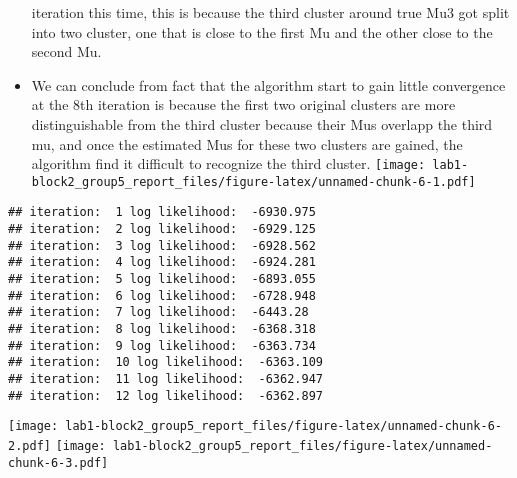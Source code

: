 \documentclass[]{article}
\begin{document}
\begin{itemize}
  iteration this time, this is because the third cluster around true Mu3
  got split into two cluster, one that is close to the first Mu and the
  other close to the second Mu.
\item
  We can conclude from fact that the algorithm start to gain little
  convergence at the 8th iteration is because the first two original
  clusters are more distinguishable from the third cluster because their
  Mus overlapp the third mu, and once the estimated Mus for these two
  clusters are gained, the algorithm find it difficult to recognize the
  third cluster.
  \texttt{[image: lab1-block2\_group5\_report\_files/figure-latex/unnamed-chunk-6-1.pdf]}
\end{itemize}

\begin{verbatim}
## iteration:  1 log likelihood:  -6930.975 
## iteration:  2 log likelihood:  -6929.125 
## iteration:  3 log likelihood:  -6928.562 
## iteration:  4 log likelihood:  -6924.281 
## iteration:  5 log likelihood:  -6893.055 
## iteration:  6 log likelihood:  -6728.948 
## iteration:  7 log likelihood:  -6443.28 
## iteration:  8 log likelihood:  -6368.318 
## iteration:  9 log likelihood:  -6363.734 
## iteration:  10 log likelihood:  -6363.109 
## iteration:  11 log likelihood:  -6362.947 
## iteration:  12 log likelihood:  -6362.897
\end{verbatim}

\texttt{[image: lab1-block2\_group5\_report\_files/figure-latex/unnamed-chunk-6-2.pdf]}
\texttt{[image: lab1-block2\_group5\_report\_files/figure-latex/unnamed-chunk-6-3.pdf]}
\end{document}
